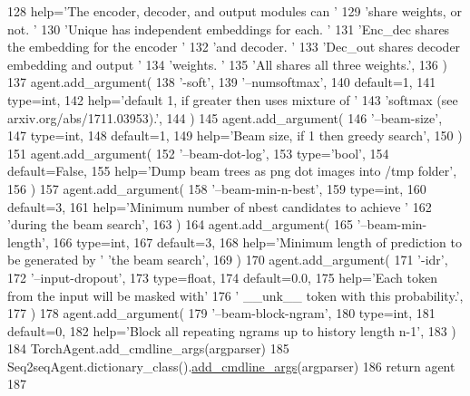 \begin{DoxyCode}
128             help=\textcolor{stringliteral}{'The encoder, decoder, and output modules can '}
129             \textcolor{stringliteral}{'share weights, or not. '}
130             \textcolor{stringliteral}{'Unique has independent embeddings for each. '}
131             \textcolor{stringliteral}{'Enc\_dec shares the embedding for the encoder '}
132             \textcolor{stringliteral}{'and decoder. '}
133             \textcolor{stringliteral}{'Dec\_out shares decoder embedding and output '}
134             \textcolor{stringliteral}{'weights. '}
135             \textcolor{stringliteral}{'All shares all three weights.'},
136         )
137         agent.add\_argument(
138             \textcolor{stringliteral}{'-soft'},
139             \textcolor{stringliteral}{'--numsoftmax'},
140             default=1,
141             type=int,
142             help=\textcolor{stringliteral}{'default 1, if greater then uses mixture of '}
143             \textcolor{stringliteral}{'softmax (see arxiv.org/abs/1711.03953).'},
144         )
145         agent.add\_argument(
146             \textcolor{stringliteral}{'--beam-size'},
147             type=int,
148             default=1,
149             help=\textcolor{stringliteral}{'Beam size, if 1 then greedy search'},
150         )
151         agent.add\_argument(
152             \textcolor{stringliteral}{'--beam-dot-log'},
153             type=\textcolor{stringliteral}{'bool'},
154             default=\textcolor{keyword}{False},
155             help=\textcolor{stringliteral}{'Dump beam trees as png dot images into /tmp folder'},
156         )
157         agent.add\_argument(
158             \textcolor{stringliteral}{'--beam-min-n-best'},
159             type=int,
160             default=3,
161             help=\textcolor{stringliteral}{'Minimum number of nbest candidates to achieve '}
162             \textcolor{stringliteral}{'during the beam search'},
163         )
164         agent.add\_argument(
165             \textcolor{stringliteral}{'--beam-min-length'},
166             type=int,
167             default=3,
168             help=\textcolor{stringliteral}{'Minimum length of prediction to be generated by '} \textcolor{stringliteral}{'the beam search'},
169         )
170         agent.add\_argument(
171             \textcolor{stringliteral}{'-idr'},
172             \textcolor{stringliteral}{'--input-dropout'},
173             type=float,
174             default=0.0,
175             help=\textcolor{stringliteral}{'Each token from the input will be masked with'}
176             \textcolor{stringliteral}{' \_\_unk\_\_ token with this probability.'},
177         )
178         agent.add\_argument(
179             \textcolor{stringliteral}{'--beam-block-ngram'},
180             type=int,
181             default=0,
182             help=\textcolor{stringliteral}{'Block all repeating ngrams up to history length n-1'},
183         )
184         TorchAgent.add\_cmdline\_args(argparser)
185         Seq2seqAgent.dictionary\_class().\hyperlink{namespaceparlai_1_1agents_1_1drqa_1_1config_a62fdd5554f1da6be0cba185271058320}{add\_cmdline\_args}(argparser)
186         \textcolor{keywordflow}{return} agent
187 
\end{DoxyCode}
